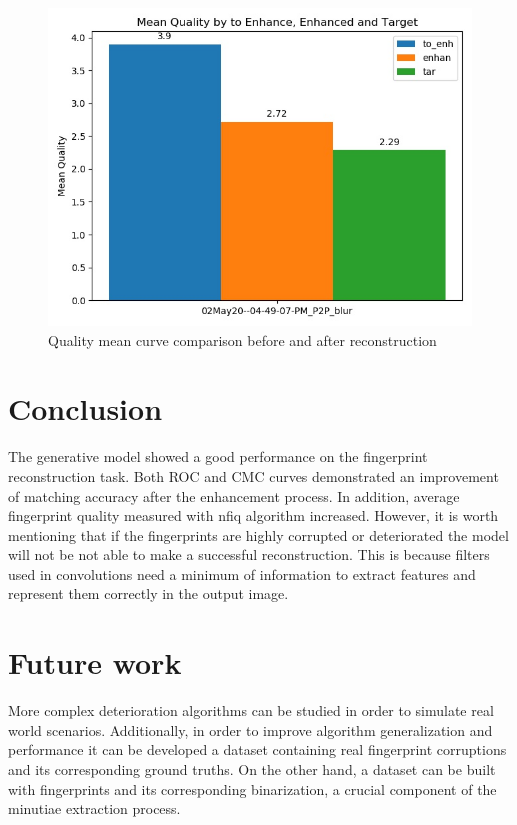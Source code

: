 \documentclass[a4paper,fleqn]{cas-dc}
\begin{document}
\begin{figure}[htbp]
\centerline{\includegraphics[scale=0.4]{figs/mean_qualities.jpg}}
\caption{Quality mean curve comparison before and after reconstruction}
\label{fig11}
\end{figure}

\section{Conclusion}
\label{sec:CON}

The generative model showed a good performance on the fingerprint reconstruction task. Both ROC and CMC curves demonstrated an improvement of matching accuracy after the enhancement process. In addition, average fingerprint quality measured with nfiq algorithm increased. However, it is worth mentioning that if the fingerprints are highly corrupted or deteriorated the model will not be not able to make a successful reconstruction. This is because filters used in convolutions need a minimum of information to extract features and represent them correctly in the output image.


\section{Future work}
\label{sec:FW}

More complex deterioration algorithms can be studied in order to simulate real world scenarios. Additionally, in order to improve algorithm generalization and performance it can be developed a dataset containing real fingerprint corruptions and its corresponding ground truths. On the other hand, a dataset can be built with fingerprints and its corresponding binarization, a crucial component of the minutiae extraction process.
\end{document}
